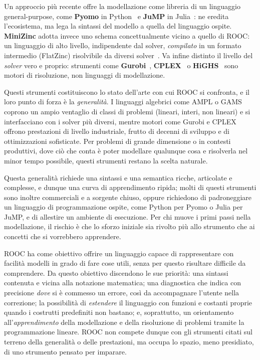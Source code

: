 Un approccio più recente offre la modellazione come libreria di un linguaggio
general-purpose, come \textbf{Pyomo} in Python~\cite{pyomo2017} e \textbf{JuMP}
in Julia~\cite{jump2017}: ne eredita l'ecosistema, ma lega la sintassi del
modello a quella del linguaggio ospite. \textbf{MiniZinc} adotta invece uno
schema concettualmente vicino a quello di ROOC: un linguaggio di alto livello,
indipendente dal solver, \emph{compilato} in un formato intermedio (FlatZinc)
risolvibile da diversi solver~\cite{minizinc2007}. Va infine distinto il livello
del \emph{solver} vero e proprio: strumenti come \textbf{Gurobi}~\cite{gurobi},
\textbf{CPLEX}~\cite{cplex} o \textbf{HiGHS}~\cite{highs2018} sono motori di
risoluzione, non linguaggi di modellazione.

Questi strumenti costituiscono lo stato dell'arte con cui ROOC si confronta, e il
loro punto di forza è la \emph{generalità}. I linguaggi algebrici come AMPL o GAMS
coprono un ampio ventaglio di classi di problemi (lineari, interi, non lineari) e
si interfacciano con i solver più diversi, mentre motori come Gurobi e CPLEX
offrono prestazioni di livello industriale, frutto di decenni di sviluppo e di
ottimizzazioni sofisticate. Per problemi di grande dimensione o in contesti
produttivi, dove ciò che conta è poter modellare qualunque cosa e risolverla nel
minor tempo possibile, questi strumenti restano la scelta naturale.

Questa generalità richiede una sintassi e una semantica ricche, articolate e complesse, e dunque una curva
di apprendimento ripida; molti di questi strumenti sono inoltre commerciali e a
sorgente chiuso, oppure richiedono di padroneggiare un linguaggio di
programmazione ospite, come Python per Pyomo o Julia per JuMP, e di allestire un
ambiente di esecuzione. Per chi muove i primi passi nella modellazione, il
rischio è che lo sforzo iniziale sia rivolto più allo strumento che ai concetti
che si vorrebbero apprendere.

ROOC ha come obiettivo offrire un linguaggio capace di rappresentare con
facilità modelli in grado di fare cose utili, senza per questo risultare difficile
da comprendere. Da questo obiettivo discendono le sue priorità: una sintassi
contenuta e vicina alla notazione matematica; una diagnostica che indica con
precisione \emph{dove} si è commesso un errore, così da accompagnare l'utente
nella correzione; la possibilità di \emph{estendere} il linguaggio con funzioni e
costanti proprie quando i costrutti predefiniti non bastano; e, soprattutto, un
orientamento all'\emph{apprendimento} della modellazione e della risoluzione di
problemi tramite la programmazione lineare. ROOC non compete dunque
con gli strumenti citati sul terreno della generalità o delle prestazioni, ma
occupa lo spazio, meno presidiato, di uno strumento pensato per imparare.

